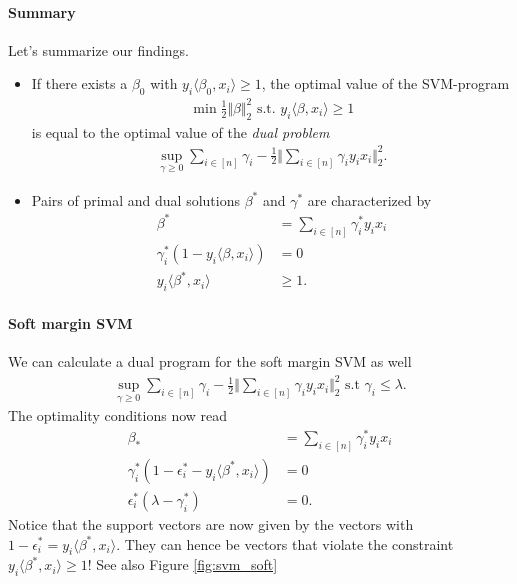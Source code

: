 \documentclass{article}
\newcommand{\sprod}[1]{\langle #1 \rangle}
\newcommand{\norm}[1]{\Vert #1 \Vert}
\begin{document}
\paragraph{Summary} Let's summarize our findings.
\begin{itemize}
    \item If there exists a $\beta_0$ with $y_i\sprod{\beta_0,x_i}\geq 1$, the optimal value of the SVM-program
    \begin{align*}
        \min \tfrac{1}{2}\norm{\beta}_2^2 \text{ s.t. } y_i\sprod{\beta,x_i} \geq 1
    \end{align*}
    is equal to the optimal value of the \emph{dual problem}
    \begin{align*}
        \sup_{\gamma \geq 0} \sum_{i \in [n]}\gamma_i -\tfrac{1}{2} \norm{\sum_{i\in [n]}\gamma_i y_i x_i}_2^2.
    \end{align*}
    \item Pairs of primal and dual solutions $\beta^*$ and $\gamma^*$
 are characterized by
 \begin{align*}
     \beta^* &= \sum_{i\in [n]} \gamma_i^*y_ix_i \\
     \gamma_i^*(1-y_i \sprod{\beta,x_i})&=0 \\
     y_i \sprod{\beta^*,x_i}&\geq1.
 \end{align*}\end{itemize}

 \paragraph{Soft margin SVM} We can calculate a dual program for the soft margin SVM as well
\begin{align*}
    \sup_{\gamma \geq 0} \sum_{i \in [n]}\gamma_i -\tfrac{1}{2} \norm{\sum_{i\in [n]}\gamma_i y_i x_i}_2^2 \text{ s.t } \gamma_i \leq \lambda.
\end{align*}
The optimality conditions now read
\begin{align*}
    \beta_* &= \sum_{i\in [n]} \gamma_i^*y_ix_i \\ 
    \gamma_i^*(1-\epsilon_i^*-y_i \sprod{\beta^*,x_i})&=0\\
    \epsilon_i^*(\lambda-\gamma_i^*)&= 0.
\end{align*}
Notice that the support vectors are now given by the vectors with $1-\epsilon_i^*=y_i \sprod{\beta^*,x_i}$. They can hence be vectors that violate the constraint $y_i \sprod{\beta^*,x_i}\geq 1$! See also Figure \ref{fig:svm_soft}
\end{document}
